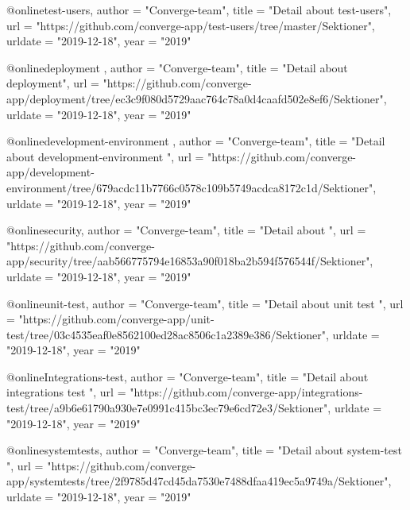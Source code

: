 @online{test-users,
    author = "Converge-team",
    title = "{Detail about test-users}",
    url = "https://github.com/converge-app/test-users/tree/master/Sektioner",
    urldate = "2019-12-18",
    year = "2019"
}


@online{deployment ,
    author = "Converge-team",
    title = "{Detail about deployment}",
    url = "https://github.com/converge-app/deployment/tree/ec3c9f080d5729aac764c78a0d4caafd502e8ef6/Sektioner",
    urldate = "2019-12-18",
    year = "2019"
}

@online{development-environment  ,
    author = "Converge-team",
    title = "{Detail about development-environment }",
    url = "https://github.com/converge-app/development-environment/tree/679acdc11b7766c0578c109b5749acdca8172c1d/Sektioner",
    urldate = "2019-12-18",
    year = "2019"
}

@online{security,
    author = "Converge-team",
    title = "{Detail about  }",
    url = "https://github.com/converge-app/security/tree/aab566775794e16853a90f018ba2b594f576544f/Sektioner",
    urldate = "2019-12-18",
    year = "2019"
}

@online{unit-test,
    author = "Converge-team",
    title = "{Detail about unit test }",
    url = "https://github.com/converge-app/unit-test/tree/03c4535eaf0e8562100ed28ac8506c1a2389e386/Sektioner",
    urldate = "2019-12-18",
    year = "2019"
}

@online{Integrations-test,
    author = "Converge-team",
    title = "{Detail about integrations test }",
    url = "https://github.com/converge-app/integrations-test/tree/a9b6e61790a930e7e0991c415bc3ec79e6cd72e3/Sektioner",
    urldate = "2019-12-18",
    year = "2019"
}

@online{systemtests,
    author = "Converge-team",
    title = "{Detail about system-test }",
    url = "https://github.com/converge-app/systemtests/tree/2f9785d47cd45da7530e7488dfaa419ec5a9749a/Sektioner",
    urldate = "2019-12-18",
    year = "2019"
}

